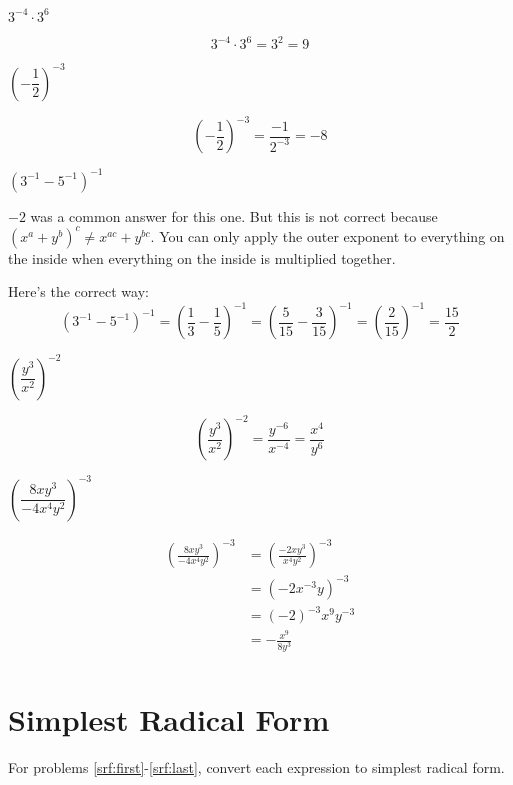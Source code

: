 \documentclass[fleqn,addpoints]{exam}
\begin{document}
\begin{questions}

\question[3] \( 3^{-4} \cdot 3^6 \)
\label{simplify:first}
\begin{solution}[2 cm]
\[
  3^{-4} \cdot 3^6 = 3^2 = 9
\]
\end{solution}

\question[3] \( \left( - \dfrac{1}{2} \right)^{-3} \)
\begin{solution}[2 cm]
\[
  \left( - \dfrac{1}{2} \right)^{-3} = \frac{-1}{2^{-3}} = -8
\]
\end{solution}


\question[5] \( (3^{-1} - 5^{-1} )^{-1} \)
\begin{solution}[3 cm]
$-2$ was a common answer for this one.  But this is not correct because $(x^a + y^b)^c \neq x^{ac} + y^{bc}$.  You can
only apply the outer exponent to everything on the inside when everything on the inside is multiplied together.

Here's the correct way:
\[
  (3^{-1} - 5^{-1} )^{-1} = (\frac{1}{3} - \frac{1}{5})^{-1} = \left( \frac{5}{15} - \frac{3}{15} \right )^{-1} 
  = \left( \frac{2}{15} \right)^{-1} = \frac{15}{2}
\]
\end{solution}

\question[5] \( \left( \dfrac{y^3}{x^2} \right)^{-2} \)
\begin{solution}[3 cm]
\[
  \left( \frac{y^3}{x^2} \right)^{-2} = \frac{y^{-6}}{x^{-4}} = \frac{x^4}{y^6}
\]
\end{solution}

\question[7] \( \left( \dfrac{8xy^3}{-4x^4y^2} \right)^{-3} \)
\label{simplify:last}
\begin{solution}[3 cm]
\begin{align*}
  \left( \frac{8xy^3}{-4x^4y^2} \right)^{-3} &= \left( \frac{-2xy^3}{x^4y^2} \right)^{-3} \\
  &= (-2x^{-3}y)^{-3} \\
  &= (-2)^{-3}x^9y^{-3} \\
  &= - \frac{x^9}{8y^3} \\
\end{align*}
\end{solution}

\section{Simplest Radical Form}

For problems \ref{srf:first}-\ref{srf:last}, convert each expression to simplest radical form.


\end{questions}
\end{document}
